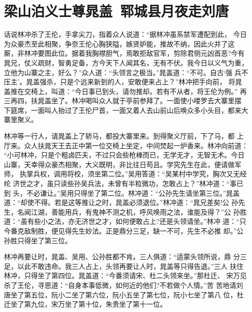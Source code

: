 \chapter{梁山泊义士尊晁盖~郓城县月夜走刘唐}

话说林冲杀了王伦，手拿尖刀，指着众人说道：“据林冲虽系禁军遭配到此，
今日为众豪杰至此相聚，争奈王伦心胸狭隘，嫉贤妒能，推故不纳，因此火并了这
厮，非林冲要图此位。据着我胸襟胆气，焉敢拒敌官军，剪除君侧元凶首恶?今有
晁兄，仗义疏财，智勇足备，方今天下人闻其名，无有不伏。我今日以义气为重，
立他为山寨之主，好么？”众人道：“头领言之极当。”晁盖道：“不可。自古‘强
兵不压主’。晁盖强杀，只是个远来新到的人，安敢便来占上？”林冲把手向前，
将晁盖推在交椅上，叫道：“今日事已到头，请勿推却。若有不从者，将王伦为例。”
再三再四，扶晁盖坐了。林冲喝叫众人就于亭前参拜了。一面使小喽罗去大寨里摆
下筵席，一面叫人抬过了王伦尸首，一面又着人去山前山后唤众多小头目，都来大
寨里聚义。

林冲等一行人，请晁盖上了轿马，都投大寨里来。到得聚义厅前，下了马，都
上厅来。众人扶晁天王去正中第一位交椅上坐定，中间焚起一炉香来。林冲向前道：
“小可林冲，只是个粗卤匹夫，不过只会些枪棒而已，无学无才，无智无术。今日
山寨，天幸得众豪杰相聚，大义既明，非比往日苟且。学究先生在此，便请做军师，
执掌兵权，调用将校，须坐第二位。”吴用答道：“吴某村中学究，胸次又无经纶
济世之才，虽只读些孙吴兵法，未曾有半粒微功，怎敢占上？”林冲道：“事已到
头，不必谦让。”吴用只得坐了第二位。林冲道：“公孙先生请坐第三位。”晁盖
道：“却使不得。若是这等推让之时，晁盖必须退位。”林冲道：“晁兄差矣!公
孙先生，名闻江湖，善能用兵，有鬼神不测之机，呼风唤雨之法，谁能及得？”公
孙胜道：“虽有些小之法，亦无济世之才，如何便敢占上?还是头领请坐。”林冲
道：“只今番克敌制胜，便见得先生妙法。正是鼎分三足，缺一不可，先生不必推
却。”公孙胜只得坐了第三位。

林冲再要让时，晁盖、吴用、公孙胜都不肯。三人俱道：“适蒙头领所说，鼎
分三足，以此不敢违命。我三人占上，头领再要让人时，晁盖等只得告退。”三人
扶住林冲，只得坐了第四位。晁盖道：“今番须请宋、杜二头领来坐。”那杜迁、
宋万见杀了王伦，寻思道：“自身本事低微，如何近的他们?不若做个人情。”苦
苦地请刘唐坐了第五位，阮小二坐了第六位，阮小五坐了第七位，阮小七坐了第八
位，杜迁坐了第九位，宋万坐了第十位，朱贵坐了第十一位。


